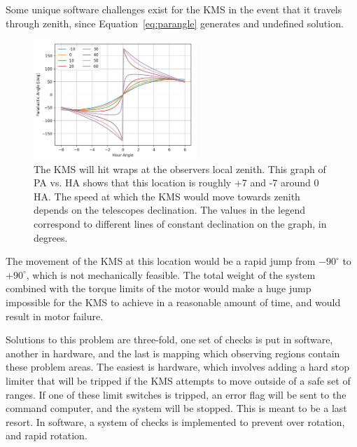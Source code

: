 \documentclass[manuscript]{aastex}
\begin{document}
Some unique software challenges exist for the KMS in the event that it travels through zenith, since Equation~\ref{eq:parangle} generates and undefined solution.  
\begin{figure}
\vspace{-0.8cm}
  \begin{center}
    \includegraphics[width=0.55\textwidth]{km6.png}
  \end{center}
  \caption[Parallactic Angle Versus Hour Angle]{The KMS will hit wraps at the observers local zenith. This graph of PA vs. HA shows that this location is roughly +7 and -7 around 0 HA. The speed at which the KMS would move towards zenith depends on the telescopes declination. The values in the legend correspond to different lines of constant declination on the graph, in degrees.}
  \label{fig:km6}
\end{figure}
The movement of the KMS at this location would be a rapid jump from $- 90^{\circ}$ to $+ 90^{\circ}$, which is not mechanically feasible. The total weight of the system combined with the torque limits of the motor would make a huge jump impossible for the KMS to achieve in a reasonable amount of time, and would result in motor failure. 

Solutions to this problem are three-fold, one set of checks is put in software, another in hardware, and the last is mapping which observing regions contain these problem areas. The easiest is hardware, which involves adding a hard stop limiter that will be tripped if the KMS attempts to move outside of a safe set of ranges. If one of these limit switches is tripped, an error flag will be sent to the command computer, and the system will be stopped. This is meant to be a last resort. In software, a system of checks is implemented to prevent over rotation, and rapid rotation.
\end{document}
